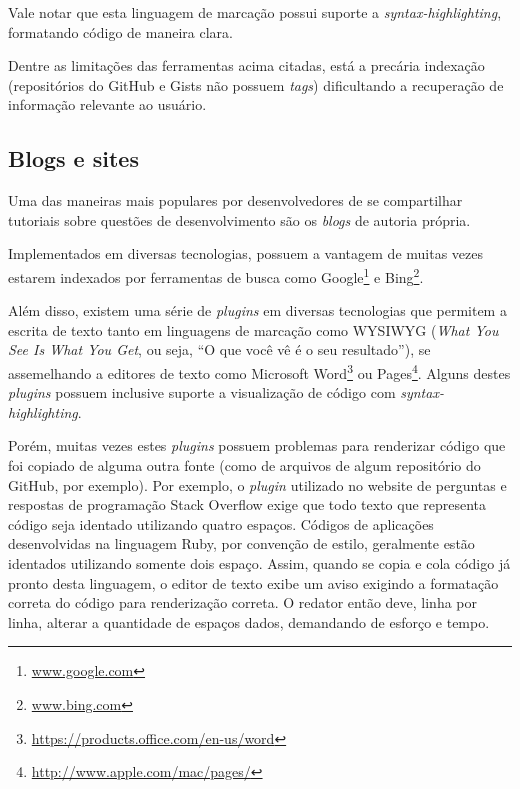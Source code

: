 Vale notar que esta linguagem de marcação possui suporte a \textit{syntax-highlighting}, formatando código de maneira clara.


Dentre as limitações das ferramentas acima citadas, está a precária indexação (repositórios do GitHub e Gists não possuem \textit{tags}) dificultando a recuperação de informação relevante ao usuário.


\subsection{Blogs e sites}

Uma das maneiras mais populares por desenvolvedores de se compartilhar tutoriais sobre questões de desenvolvimento são os \textit{blogs} de autoria própria.

Implementados em diversas tecnologias, possuem a vantagem de muitas vezes estarem indexados por ferramentas de busca como Google\footnote{\url{www.google.com}} e Bing\footnote{\url{www.bing.com}}.

Além disso, existem uma série de \textit{plugins} em diversas tecnologias que permitem a escrita de texto tanto em linguagens de marcação como WYSIWYG (\textit{What You See Is What You Get}, ou seja, ``O que você vê é o seu resultado''), se assemelhando a editores de texto como Microsoft Word\footnote{\url{https://products.office.com/en-us/word}} ou Pages\footnote{\url{http://www.apple.com/mac/pages/}}. Alguns destes \textit{plugins} possuem inclusive suporte a visualização de código com \textit{syntax-highlighting}.

Porém, muitas vezes estes \textit{plugins} possuem problemas para renderizar código que foi copiado de alguma outra fonte (como de arquivos de algum repositório do GitHub, por exemplo). Por exemplo, o \textit{plugin} utilizado no website de perguntas e respostas de programação Stack Overflow exige que todo texto que representa código seja identado utilizando quatro espaços. Códigos de aplicações desenvolvidas na linguagem Ruby, por convenção de estilo, geralmente estão identados utilizando somente dois espaço. Assim, quando se copia e cola código já pronto desta linguagem, o editor de texto exibe um aviso exigindo a formatação correta do código para renderização correta. O redator então deve, linha por linha, alterar a quantidade de espaços dados, demandando de esforço e tempo.

